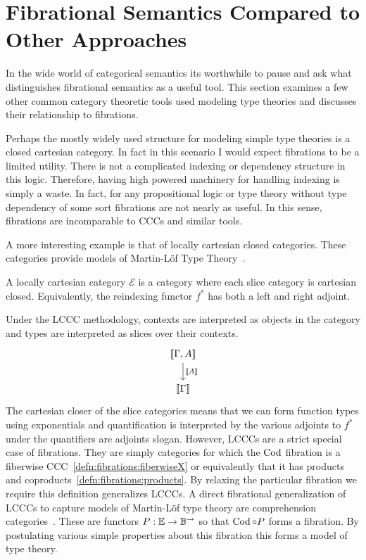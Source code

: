 \section{Fibrational Semantics Compared to Other Approaches}

In the wide world of categorical semantics its worthwhile to pause and
ask what distinguishes fibrational semantics as a useful tool.
This section examines a few other common category theoretic tools used
modeling type theories and discusses their relationship to fibrations.

Perhaps the mostly widely used structure for modeling simple type
theories is a closed cartesian category. In fact in this scenario I
would expect fibrations to be a limited utility. There is not a
complicated indexing or dependency structure in this logic. Therefore,
having high powered machinery for handling indexing is simply a
waste. In fact, for any propositional logic or type theory without
type dependency of some sort fibrations are not nearly as useful. In
this sense, fibrations are incomparable to CCCs and similar tools.

A more interesting example is that of locally cartesian closed
categories. These categories provide models of Martin-L\"of Type
Theory~\cite{MartinLof:84}.
\begin{defn}\label{defn:othersemantics:lccc}
  A locally cartesian category $\mathcal{E}$ is a category where each
  slice category is cartesian closed. Equivalently, the reindexing
  functor $f^*$ has both a left and right adjoint.
\end{defn}
Under the LCCC methodology, contexts are interpreted as objects in the
category and types are interpreted as slices over their contexts.
\[
  \begin{tikzcd}
    \denote{\Gamma, A} \ar[d, "\denote{A}"]\\
    \denote{\Gamma}
  \end{tikzcd}
\]
The cartesian closer of the slice categories means that we can form
function types using exponentials and quantification is interpreted by
the various adjoints to $f^*$ under the quantifiers are adjoints
slogan. However, LCCCs are a strict special case of fibrations. They
are simply categories for which the $\operatorname{Cod}$ fibration is a fiberwise
CCC~\ref{defn:fibrations:fiberwiseX} or equivalently that it has
products and coproducts~\ref{defn:fibrations:products}. By relaxing
the particular fibration we require this definition generalizes
LCCCs. A direct fibrational generalization of LCCCs to capture models
of Martin-L\"of type theory are comprehension
categories~\cite{Jacobs:93}. These are functors $P : \mathbb{E} \to
\mathbb{B}^{\to}$ so that $\operatorname{Cod} \circ P$ forms a fibration. By postulating
various simple properties about this fibration this forms a model of
type theory.

